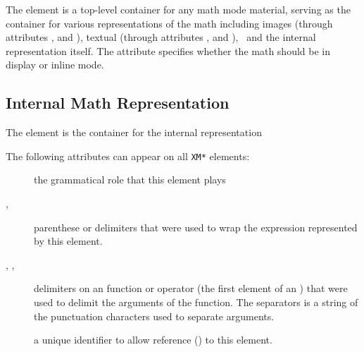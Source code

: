 \documentclass{book}
\begin{document}
The  element is a top-level container for any math mode material,
serving as the container for various representations of the math including
images (through attributes ,  and ), 
textual (through attributes ,  and ),
\MathML\ and the internal representation itself.  
The  attribute specifies whether the math should be in display or inline mode.

\subsection{Internal Math Representation}\label{math.details.representation}
The  element is the container for the internal representation

The following attributes can appear on all \texttt{XM*} elements:
\begin{description}
\item[] the grammatical role that this element plays 
\item[, ] parenthese or delimiters that were used to wrap the
   expression represented by this element.
\item[, , ] delimiters on an function or operator
   (the first element of an )  that were used to delimit the arguments of the function.
    The separators is a string of the punctuation characters used to separate arguments.
\item[] a unique identifier to allow reference () to this element.
\end{description}
\end{document}

